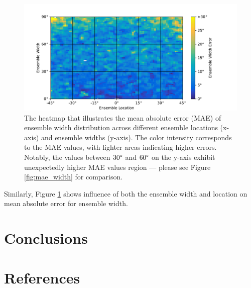 \documentclass{article}
\begin{document}
\begin{figure}
    \centering
    \includegraphics[width=\linewidth]{../figures/map_mae_width.pdf}
    \caption{\label{fig:map_mae_width}The heatmap that illustrates the mean absolute error (MAE) of ensemble width distribution across different ensemble locations (x-axis) and ensemble widths (y-axis). The color intensity corresponds to the MAE values, with lighter areas indicating higher errors. Notably, the values between $30\degree$ and $60\degree$ on the y-axis exhibit unexpectedly higher MAE values region --- please see Figure \ref{fig:mae_width} for comparison. }
\end{figure}

Similarly, Figure \ref{fig:map_mae_width} shows influence of both the ensemble width and location on mean absolute error for ensemble width.

\section{Conclusions}
\section{References}

\cite{greenwade93}



\end{document}
